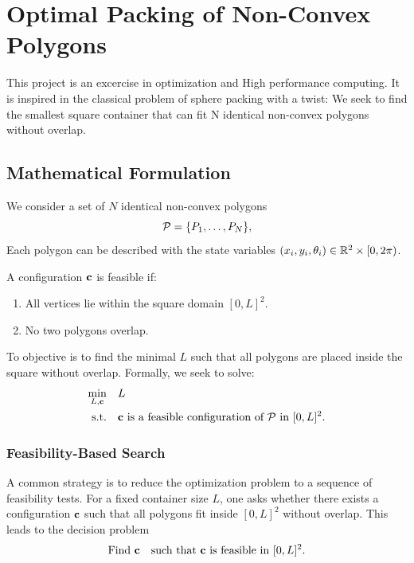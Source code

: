 \chapter{Optimal Packing of Non-Convex Polygons}

This project is an excercise in optimization and High performance computing.
   It is inspired in the classical problem of sphere packing with a twist:
   We seek to find the smallest square container that can fit N identical
    non-convex polygons without overlap.

\section{Mathematical Formulation}

We consider a set of $N$ identical non-convex polygons
\[
\mathcal{P} = \{P_1, \dots, P_N\},
\]
Each polygon can be described with the state variables $(x_i, y_i, \theta_i) \in \mathbb{R}^2 \times [0,2\pi)$.

\begin{definition}
A configuration $\mathbf{c}$ is feasible if:
\begin{enumerate}
  \item All vertices lie within the square domain $[0,L]^2$.
  \item No two polygons overlap.
\end{enumerate}
\end{definition}

To objective is to find the minimal $L$ such that all polygons 
are placed inside the square without overlap. Formally, we seek to solve:
\[
\begin{aligned}
\min_{L, \mathbf{c}} \quad & L \\
\text{s.t.} \quad & \mathbf{c} \text{ is a feasible configuration of } \mathcal{P} \text{ in } [0,L]^2.
\end{aligned}
\]


\subsection{Feasibility-Based Search}

A common strategy is to reduce the optimization problem to a sequence of feasibility tests. For a fixed container size $L$, one asks whether there exists a configuration $\mathbf{c}$ such that all polygons fit inside $[0,L]^2$ without overlap. This leads to the decision problem
\[
\text{Find } \mathbf{c} \quad \text{such that } \mathbf{c} \text{ is feasible in } [0,L]^2.
\]


